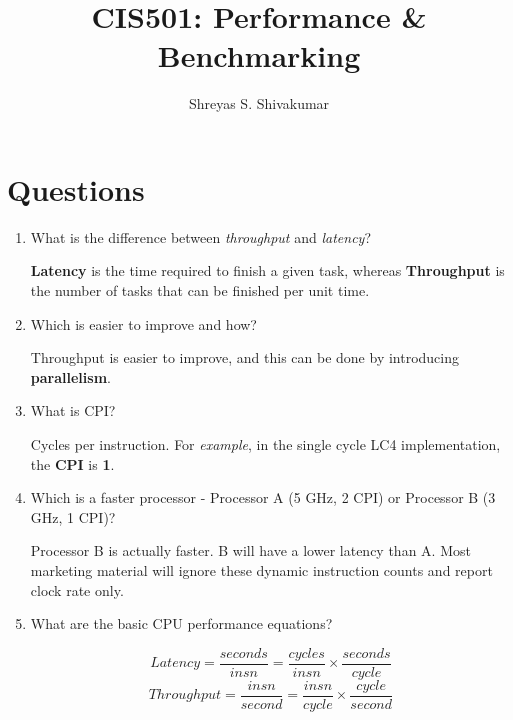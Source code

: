 \documentclass[12pt]{article}
\title{CIS501: Performance \& Benchmarking}
\author[1]{Shreyas S. Shivakumar}
\newenvironment{QandA}{\begin{enumerate}[label=\bfseries\alph*.]\bfseries}
                      {\end{enumerate}}
\newenvironment{answered}{\par\quad\normalfont}{}
\begin{document}
\maketitle

\section{Questions}

\begin{QandA}
   \item What is the difference between \textit{throughput} and \textit{latency}?
        \begin{answered}
        \textbf{Latency} is the time required to finish a given task, whereas \textbf{Throughput} is the number of tasks that can be finished per unit time.
        \end{answered}
        
    \item Which is easier to improve and how?
        \begin{answered}
        Throughput is easier to improve, and this can be done by introducing \textbf{parallelism}.
        \end{answered}
        
    \item What is CPI?
        \begin{answered}
        Cycles per instruction. For \textit{example}, in the single cycle LC4 implementation, the \textbf{CPI} is \textbf{1}.
        \end{answered}
        
    \item Which is a faster processor - Processor A (5 GHz, 2 CPI) or Processor B (3 GHz, 1 CPI)?
        \begin{answered}
        Processor B is actually faster. B will have a lower latency than A. Most marketing material will ignore these dynamic instruction counts and report clock rate only.
        \end{answered}
        
    \item What are the basic CPU performance equations?
        \begin{answered}
        \begin{equation}
            Latency = \frac{seconds}{insn} = \frac{cycles}{insn} \times \frac{seconds}{cycle}
        \end{equation}
        \begin{equation}
            Throughput = \frac{insn}{second} = \frac{insn}{cycle} \times \frac{cycle}{second}
        \end{equation}        
        \end{answered}


\end{QandA}
\end{document}
